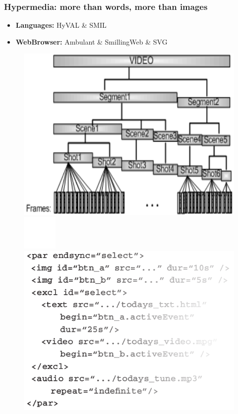 \documentclass[compress]{beamer}
\begin{document}
		\begin{frame}[c]
		\frametitle{Hypermedia: more than words, more than images}
		\begin{itemize}		
		\item \textbf{Languages:} HyVAL \& SMIL
		\vfill
		\item \textbf{WebBrowser:} Ambulant \& SmillingWeb \& SVG
		\end{itemize}
		
			\begin{figure}
			\includegraphics[height=0.4\textheight]{figures/hyval.png}
									\includegraphics[height=0.1\textheight]{figures/space.png}
			\includegraphics[height=0.4\textheight]{figures/smil.png}
		\end{figure}
		\end{frame}
\end{document}
